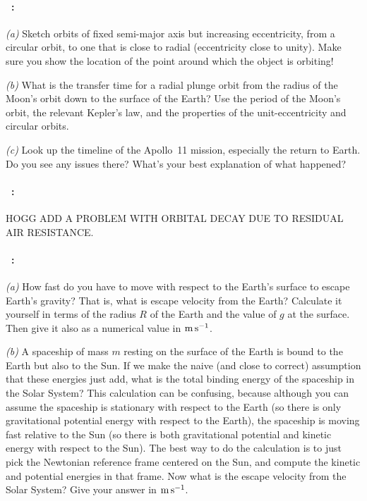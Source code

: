 \documentclass[12pt]{article}
\begin{document}
\paragraph{\problemname~\theproblem:}%
\textsl{(a)}
Sketch orbits of fixed semi-major axis but increasing
eccentricity, from a circular orbit, to one that is close to radial
(eccentricity close to unity). Make sure you show the location of
the point around which the object is orbiting!

\textsl{(b)}
What is the transfer time for a radial plunge orbit
from the radius of the Moon's orbit down to the surface of the Earth?
Use the period of the Moon's orbit, the relevant  Kepler's law, and
the properties of the unit-eccentricity and circular orbits.

\textsl{(c)}
Look up the timeline of the Apollo~11 mission, especially
the return to Earth.  Do you see any issues there? What's your best
explanation of what happened?

\paragraph{\problemname~\theproblem:}%
HOGG ADD A PROBLEM WITH ORBITAL DECAY DUE TO RESIDUAL AIR RESISTANCE.

\paragraph{\problemname~\theproblem:}%
\textsl{(a)}
How fast do you have to move with respect to the Earth's surface to
escape Earth's gravity? That is, what is escape velocity from the Earth?
Calculate it yourself in terms of the radius $R$ of the Earth and the
value of $g$ at the surface. Then give it also as a numerical value in $\mathrm{m}\,\mathrm{s}^{-1}$.

\textsl{(b)} A spaceship of mass $m$ resting on the surface of the
Earth is bound to the Earth but also to the Sun. If we make
the naive (and close to correct) assumption that these energies just
add, what is the total binding energy of the spaceship in the Solar
System? This calculation can be confusing, because although you can assume
the spaceship is stationary with respect to the Earth (so there is
only gravitational potential energy with respect to the Earth), the
spaceship is moving fast relative to the Sun (so there is both
gravitational potential and kinetic energy with respect to the
Sun). The best way to do the calculation is to just pick the Newtonian reference
frame centered on the Sun, and compute the kinetic and potential
energies in that frame. Now what is the escape velocity from the Solar
System? Give your answer in $\mathrm{m}\,\mathrm{s}^{-1}$.
\end{document}
